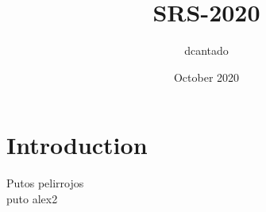 \documentclass{article}
\title{SRS-2020}
\author{dcantado }
\date{October 2020}
\begin{document}
\maketitle

\section{Introduction}
Putos pelirrojos\\
puto alex2
\end{document}
